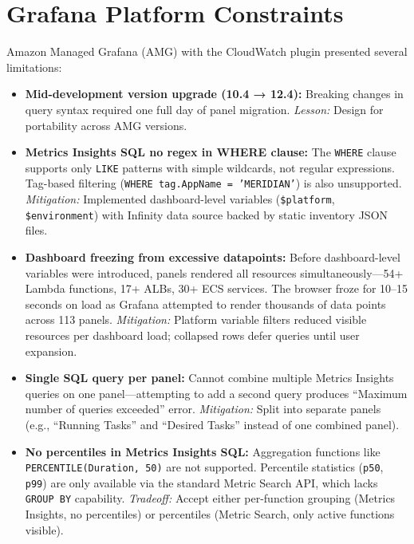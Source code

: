 \FloatBarrier

\section{Grafana Platform Constraints}
\label{sec:challenges-grafana}


Amazon Managed Grafana (AMG) with the CloudWatch plugin presented several
limitations:

\begin{itemize}
    \item \textbf{Mid-development version upgrade (10.4 → 12.4):} Breaking changes
          in query syntax required one full day of panel migration.
          \textit{Lesson:} Design for portability across AMG versions.

    \item \textbf{Metrics Insights SQL no regex in WHERE clause:} The
          \texttt{WHERE} clause supports only \texttt{LIKE} patterns with
          simple wildcards, not regular expressions. Tag-based filtering
          (\texttt{WHERE tag.AppName = 'MERIDIAN'}) is also unsupported.
          \textit{Mitigation:} Implemented dashboard-level variables
          (\texttt{\$platform}, \texttt{\$environment}) with Infinity
          data source backed by static inventory JSON files.

    \item \textbf{Dashboard freezing from excessive datapoints:} Before
          dashboard-level variables were introduced, panels rendered all
          resources simultaneously---54+ Lambda functions, 17+ ALBs, 30+ ECS
          services. The browser froze for 10--15 seconds on load as Grafana
          attempted to render thousands of data points across 113 panels.
          \textit{Mitigation:} Platform variable filters reduced visible
          resources per dashboard load; collapsed rows defer queries until
          user expansion.

    \item \textbf{Single SQL query per panel:} Cannot combine multiple Metrics
          Insights queries on one panel---attempting to add a second query
          produces ``Maximum number of queries exceeded'' error.
          \textit{Mitigation:} Split into separate panels (e.g., ``Running
          Tasks'' and ``Desired Tasks'' instead of one combined panel).

    \item \textbf{No percentiles in Metrics Insights SQL:} Aggregation functions
          like \texttt{PERCENTILE(Duration, 50)} are not supported. Percentile
          statistics (\texttt{p50}, \texttt{p99}) are only available via the
          standard Metric Search API, which lacks \texttt{GROUP BY} capability.
          \textit{Tradeoff:} Accept either per-function grouping (Metrics
          Insights, no percentiles) or percentiles (Metric Search, only active
          functions visible).


\end{itemize}
